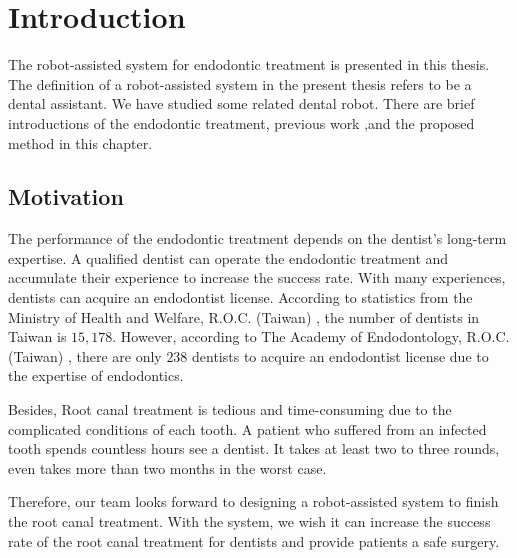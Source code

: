 \chapter{Introduction}
The robot-assisted system for endodontic treatment is presented in this thesis. The definition of a robot-assisted system in the present thesis refers to be a dental assistant. 
We have studied some related dental robot. There are brief introductions of the endodontic treatment, previous work ,and the proposed method in this chapter.
\section{Motivation}
\hspace*{6mm}The performance of the endodontic treatment depends on the dentist's long-term expertise. A qualified dentist can operate the endodontic treatment and accumulate their experience to increase the success rate. With many experiences, dentists can acquire an endodontist license. According to statistics from the Ministry of Health and Welfare, R.O.C. (Taiwan) \cite{web1}, the number of dentists in Taiwan is $15,178$. However, according to The Academy of Endodontology, R.O.C. (Taiwan) \cite{web2}, there are only $238$ dentists to acquire an endodontist license due to the expertise of endodontics. 
\par
Besides, Root canal treatment is tedious and time-consuming due to the complicated conditions of each tooth. A patient who suffered from an infected tooth spends countless hours see a dentist. It takes at least two to three rounds, even takes more than two months in the worst case. 
\par
Therefore, our team looks forward to designing a robot-assisted system to finish the root canal treatment.  With the system, we wish it can increase the success rate of the root canal treatment for dentists and provide patients a safe surgery.
